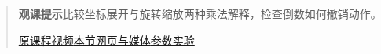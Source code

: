 \begin{quote}\small\textbf{观课提示}\quad 比较坐标展开与旋转缩放两种乘法解释，检查倒数如何撤销动作。

\href{https://www.youtube.com/watch?v=5PcpBw5Hbwo}{原课程视频}\quad\href{https://vitael04213.github.io/3blue1brown-notes/lessons/ldm-complex-numbers.html}{本节网页与媒体}\quad\href{https://vitael04213.github.io/3blue1brown-notes/lab.html\#complex}{参数实验}
\end{quote}
